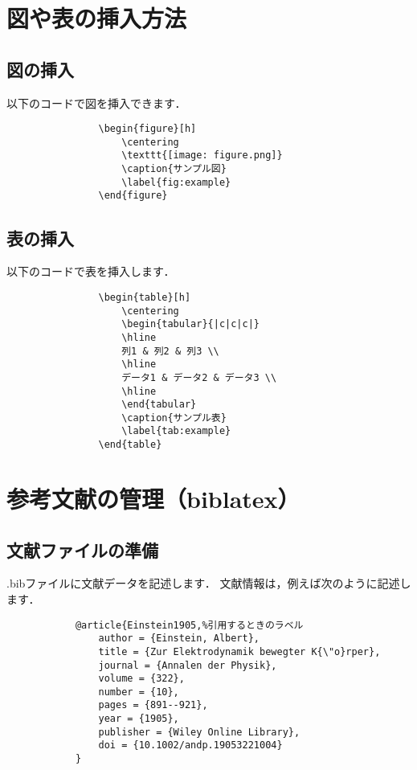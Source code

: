     \section{図や表の挿入方法}
        \subsection{図の挿入}
        以下のコードで図を挿入できます．
            \begin{verbatim}
                \begin{figure}[h]
                    \centering
                    \texttt{[image: figure.png]}
                    \caption{サンプル図}
                    \label{fig:example}
                \end{figure}
            \end{verbatim}

        \subsection{表の挿入}
        以下のコードで表を挿入します．
            \begin{verbatim}
                \begin{table}[h]
                    \centering
                    \begin{tabular}{|c|c|c|}
                    \hline
                    列1 & 列2 & 列3 \\
                    \hline
                    データ1 & データ2 & データ3 \\
                    \hline
                    \end{tabular}
                    \caption{サンプル表}
                    \label{tab:example}
                \end{table}
            \end{verbatim}

    \section{参考文献の管理（biblatex）}
        \subsection{文献ファイルの準備}
        .bibファイルに文献データを記述します．
        文献情報は，例えば次のように記述します．
        \begin{verbatim}
            @article{Einstein1905,%引用するときのラベル
                author = {Einstein, Albert},
                title = {Zur Elektrodynamik bewegter K{\"o}rper},
                journal = {Annalen der Physik},
                volume = {322},
                number = {10},
                pages = {891--921},
                year = {1905},
                publisher = {Wiley Online Library},
                doi = {10.1002/andp.19053221004}
            }
        \end{verbatim}

